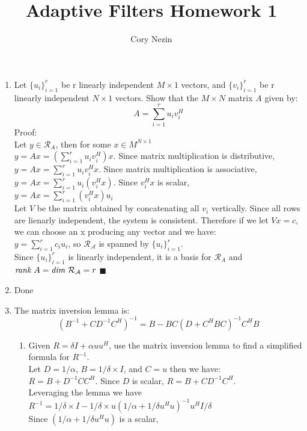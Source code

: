 \documentclass[12pt]{article}
\title{Adaptive Filters Homework 1}
\author{Cory Nezin}
\begin{document}
\maketitle
\begin{enumerate}
\item Let $\{u_i\}_{i=1}^r$ be r linearly independent $M \times 1$ vectors, and $\{v_i\}_{i=1}^r$ be r linearly independent $N\times 1$ vectors.  Show that the $M \times N$ matrix $A$ given by:
$$ A = \sum_{i=1}^r u_iv_i^H$$
Proof:\\
Let $y \in \mathcal{R}_A$, then for some $x\in M^{N\times 1}$\\
$y = Ax = \left(\sum_{i=1}^r u_iv_i^H\right)x$.  Since matrix multiplication is distributive,\\
$y = Ax = \sum_{i=1}^r u_iv_i^H x$.  Since matrix multiplication is associative,\\
$y = Ax = \sum_{i=1}^r u_i(v_i^H x)$.  Since $v_i^H x$ is scalar,\\
$y = Ax = \sum_{i=1}^r (v_i^Hx) u_i$\\
Let $V$ be the matrix obtained by concatenating all $v_i$ vertically.  Since all rows are lienarly independent, the system is consistent.
Therefore if we let $Vx=c$, we can choose an x producing any vector and we have:\\
$y = \sum_{i=1}^r c_iu_i$, so $\mathcal{R_A}$ is spanned by $\{u_i\}_{i=1}^r$.\\
Since $\{u_i\}_{i=1}^r$ is linearly independent, it is a basis for $\mathcal{R}_A$ and\\
$\text{\it rank } A = \text{\it dim } \mathcal{R_A} = r$ $\blacksquare$
\item Done 
\item The matrix inversion lemma is:\\
$$(B^{-1} + CD^{-1}C^H)^{-1} = B - BC(D+C^HBC)^{-1}C^HB$$
\begin{enumerate}
\item Given $R = \delta I + \alpha uu^H$, use the matrix inversion lemma to find a simplified formula for $R^{-1}$.\\
Let $D = 1/\alpha$, $ B = 1/\delta \times I$, and $C = u$ then we have:\\
$R = B + D^{-1}CC^H$.  Since $D$ is scalar, $R = B + CD^{-1}C^H$.\\
Leveraging the lemma we have\\
$R^{-1} = 1/\delta \times I - 1/\delta \times u (1/\alpha + 1/\delta u^Hu)^{-1} u^H I/\delta$\\
Since $(1/\alpha + 1/\delta u^Hu)$ is a scalar,\\

\end{enumerate}
\end{enumerate}
\end{document}
